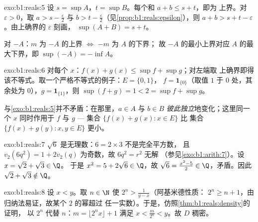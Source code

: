 \begin{solution}{exo:b1:reals:5}
设 $s = \sup A$，$t = \sup B$。每个和 $a + b \leq s + t$，即为
上界。对 $\varepsilon > 0$，取 $a > s - \frac\varepsilon2$ 与
$b > t - \frac\varepsilon2$（见\cref{prop:b1:reals:epsilon}），则 $a +
b > s + t - \varepsilon$。由上确界的 $\varepsilon$ 刻画，
$\sup(A+B) = s + t$。

对 $-A$：$m$ 为 $-A$ 的上界 $\iff$ $-m$ 为 $A$ 的下界；
故 $-A$ 的最小上界对应
$A$ 的最大下界，即 $\sup(-A) = -\inf A$。
\end{solution}

\begin{solution}{exo:b1:reals:6}
对每个 $x$：$f(x) + g(x) \leq \sup f + \sup g$；对左端取
上确界即得该不等式。取一个严格不等式的例子：$E = \{0, 1\}$，
$f = \mathbf{1}_{\{0\}}$（取值 $1$ 于 $0$ 处，其余处为 $0$），$g =
\mathbf{1}_{\{1\}}$，则 $\sup(f + g) = 1 < 2 = \sup f + \sup g$。

与\cref{exo:b1:reals:5}并不矛盾：在那里，$a \in A$ 与 $b
\in B$ \emph{彼此独立}地变化；这里同一个 $x$ 同时作用于 $f$
与 $g$ --- 集合 $\{f(x) + g(x) : x \in E\}$ 比
集合 $\{f(x) + g(y) : x, y \in E\}$ 更小。
\end{solution}

\begin{solution}{exo:b1:reals:7}
$\sqrt 6$ 是无理数：$6 = 2 \times 3$ 不是完全平方数，
且 $v_2(6q^2) = 1 + 2v_2(q)$ 为奇数，故 $6q^2 = r^2$ 无解
（参见\cref{exo:b1:arith:7}）。设 $x = \sqrt 2 + \sqrt 3 \in \Q$。
于是 $x^2 = 5 + 2\sqrt 6 \in \Q$，故 $\sqrt 6 = \frac{x^2 - 5}{2} \in
\Q$，矛盾。因此 $\sqrt 2 + \sqrt 3 \notin \Q$。
\end{solution}

\begin{solution}{exo:b1:reals:8}
设 $x < y$。取 $n \in \N$ 使 $2^n > \frac{1}{y - x}$（阿基米德性质：
$2^n \geq n + 1$，由归纳法易证，故某个 $2$ 的幂超过
任一实数）。于是，仿照\cref{thm:b1:reals:density}的证明，
以 $2^n$ 代替 $n$：$m = \lfloor 2^n x \rfloor + 1$ 满足 $x <
\frac{m}{2^n} < y$。故 $D$ 稠密。
\end{solution}

